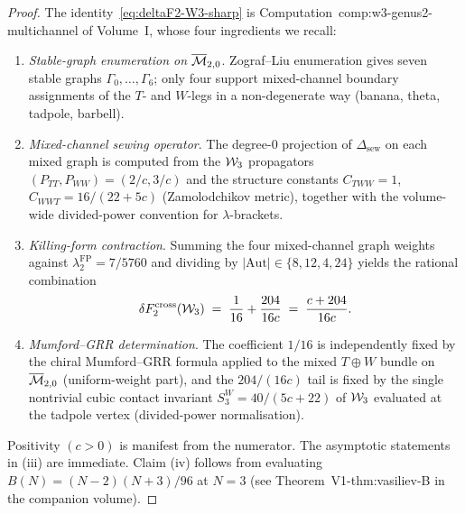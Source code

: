 \begin{proof}
The identity~\eqref{eq:deltaF2-W3-sharp} is
Computation~\textup{comp:w3-genus2-multichannel} of
Volume~I, whose four ingredients we recall:
\begin{enumerate}[label=\textup{(\arabic*)}]
\item \emph{Stable-graph enumeration on $\overline{\mathcal{M}}_{2,0}$}.
Zograf--Liu enumeration gives seven stable graphs
$\Gamma_0,\dots,\Gamma_6$; only four support
mixed-channel boundary assignments of the $T$- and
$W$-legs in a non-degenerate way (banana, theta,
tadpole, barbell).
\item \emph{Mixed-channel sewing operator}. The
degree-$0$ projection of $\Delta_{\mathrm{sew}}$ on
each mixed graph is computed from the $\mathcal{W}_3$
propagators $(P_{TT}, P_{WW}) = (2/c,3/c)$ and the
structure constants
$C_{TWW} = 1$, $C_{WWT} = 16/(22+5c)$ (Zamolodchikov
metric), together with the volume-wide divided-power
convention for $\lambda$-brackets.
\item \emph{Killing-form contraction}. Summing the four
mixed-channel graph weights against
$\lambda_2^{\mathrm{FP}} = 7/5760$ and dividing by
$|\mathrm{Aut}|\in\{8,12,4,24\}$ yields the rational
combination
\[
\delta F_2^{\mathrm{cross}}(\mathcal{W}_3) \;=\;
\frac{1}{16} + \frac{204}{16c}
\;=\; \frac{c+204}{16c}.
\]
\item \emph{Mumford--GRR determination}. The coefficient
$1/16$ is independently fixed by the chiral
Mumford--GRR formula applied to the mixed $T\oplus W$
bundle on $\overline{\mathcal{M}}_{2,0}$ (uniform-weight part),
and the $204/(16c)$ tail is fixed by the single
nontrivial cubic contact invariant
$S_3^W = 40/(5c{+}22)$ of $\mathcal{W}_3$ evaluated at the
tadpole vertex (divided-power normalisation).
\end{enumerate}
Positivity $(c>0)$ is manifest from the numerator.
The asymptotic statements in (iii) are immediate. Claim
(iv) follows from evaluating $B(N)=(N-2)(N+3)/96$ at
$N=3$ (see Theorem~\textup{V1-thm:vasiliev-B} in the
companion volume).
\end{proof}

